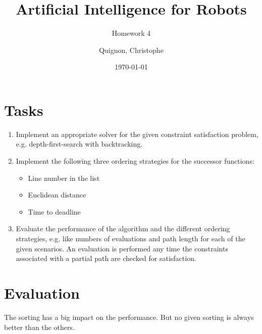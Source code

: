 \documentclass{scrartcl}
\begin{document}
\title{Artificial Intelligence for Robots}
\subtitle{Homework 4}
\author{
  Quignon, Christophe \\
} 
\date{\today}

\maketitle{}
\section{Tasks}
\begin{enumerate}
  \item Implement an appropriate solver for the given constraint satisfaction problem, e.g. depth-first-search with backtracking.
  \item Implement the following three ordering strategies for the successor functions:
  \begin{itemize}
    \item Line number in the list
    \item Euclidean distance
    \item Time to deadline
  \end{itemize}
  \item Evaluate the performance of the algorithm and the different ordering strategies, e.g. like numbers
of evaluations and path length for each of the given scenarios. An evaluation is performed any
time the constraints associated with a partial path are checked for satisfaction.
\end{enumerate}
\newpage
\section{Evaluation}

The sorting has a big impact on the performance. But no given sorting is always better than the others.
\end{document}
